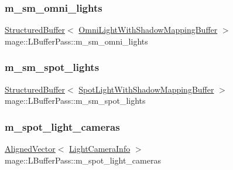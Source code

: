 \hypertarget{structmage_1_1_l_buffer_pass_aa5fa46c76d4d7d58141eeb021bb9f20c}{}\label{structmage_1_1_l_buffer_pass_aa5fa46c76d4d7d58141eeb021bb9f20c} 
\subsubsection{\texorpdfstring{m\+\_\+sm\+\_\+omni\+\_\+lights}{m\_sm\_omni\_lights}}
{\footnotesize\ttfamily \hyperlink{classmage_1_1_structured_buffer}{Structured\+Buffer}$<$ \hyperlink{structmage_1_1_omni_light_with_shadow_mapping_buffer}{Omni\+Light\+With\+Shadow\+Mapping\+Buffer} $>$ mage\+::\+L\+Buffer\+Pass\+::m\+\_\+sm\+\_\+omni\+\_\+lights\hspace{0.3cm}{\ttfamily [private]}}

\hypertarget{structmage_1_1_l_buffer_pass_a5630c1edc1d0833d08e0350bef5ec8a5}{}\label{structmage_1_1_l_buffer_pass_a5630c1edc1d0833d08e0350bef5ec8a5} 
\subsubsection{\texorpdfstring{m\+\_\+sm\+\_\+spot\+\_\+lights}{m\_sm\_spot\_lights}}
{\footnotesize\ttfamily \hyperlink{classmage_1_1_structured_buffer}{Structured\+Buffer}$<$ \hyperlink{structmage_1_1_spot_light_with_shadow_mapping_buffer}{Spot\+Light\+With\+Shadow\+Mapping\+Buffer} $>$ mage\+::\+L\+Buffer\+Pass\+::m\+\_\+sm\+\_\+spot\+\_\+lights\hspace{0.3cm}{\ttfamily [private]}}

\hypertarget{structmage_1_1_l_buffer_pass_ae09a921906a3b53074b9d08c1594928f}{}\label{structmage_1_1_l_buffer_pass_ae09a921906a3b53074b9d08c1594928f} 
\subsubsection{\texorpdfstring{m\+\_\+spot\+\_\+light\+\_\+cameras}{m\_spot\_light\_cameras}}
{\footnotesize\ttfamily \hyperlink{namespacemage_a8664bfb5ce2179fc64eae9f82c8a5ba8}{Aligned\+Vector}$<$ \hyperlink{structmage_1_1_light_camera_info}{Light\+Camera\+Info} $>$ mage\+::\+L\+Buffer\+Pass\+::m\+\_\+spot\+\_\+light\+\_\+cameras\hspace{0.3cm}{\ttfamily [private]}}

